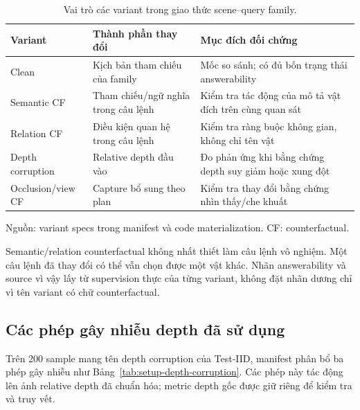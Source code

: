 \begin{table}[htbp]
    \centering
    \setlength{\tabcolsep}{4pt}
    \renewcommand{\arraystretch}{1.15}
    \caption{Vai trò các variant trong giao thức scene--query family.}
    \label{tab:setup-variants}
    \small
    \begin{tabularx}{\textwidth}{@{}>{\raggedright\arraybackslash}p{}>{\raggedright\arraybackslash}p{}>{\raggedright\arraybackslash}X@{}}
        \toprule
        Variant & Thành phần thay đổi & Mục đích đối chứng \\
        \midrule
        Clean & Kịch bản tham chiếu của family &
        Mốc so sánh; có đủ bốn trạng thái answerability \\
        Semantic CF & Tham chiếu/ngữ nghĩa trong câu lệnh &
        Kiểm tra tác động của mô tả vật đích trên cùng quan sát \\
        Relation CF & Điều kiện quan hệ trong câu lệnh &
        Kiểm tra ràng buộc không gian, không chỉ tên vật \\
        Depth corruption & Relative depth đầu vào &
        Đo phản ứng khi bằng chứng depth suy giảm hoặc xung đột \\
        Occlusion/view CF & Capture bổ sung theo plan &
        Kiểm tra thay đổi bằng chứng nhìn thấy/che khuất \\
        \bottomrule
    \end{tabularx}
    \vspace{2pt}
    {\footnotesize\raggedright Nguồn: variant specs trong manifest và code
    materialization. CF: counterfactual.\par}
\end{table}

Semantic/relation counterfactual không nhất thiết làm câu
lệnh vô nghiệm. Một câu lệnh đã thay đổi có thể vẫn chọn
được một vật khác. Nhãn answerability và source vì vậy lấy
từ supervision thực của từng variant, không đặt nhãn dương
chỉ vì tên variant có chữ counterfactual.

\subsection{Các phép gây nhiễu depth đã sử dụng}

Trên 200 sample mang tên depth corruption của Test-IID,
manifest phân bổ ba phép gây nhiễu như
Bảng~\ref{tab:setup-depth-corruption}. Các phép này tác động
lên ảnh relative depth đã chuẩn hóa; metric depth gốc
được giữ riêng để kiểm tra và truy vết.

